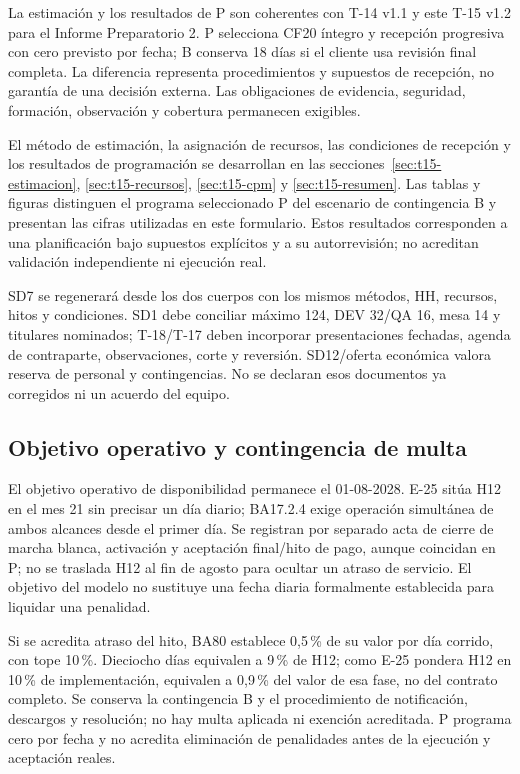 La estimación y los resultados de P son coherentes con T-14 v1.1 y este T-15 v1.2 para el Informe Preparatorio 2. P selecciona CF20 íntegro y recepción progresiva con cero previsto por fecha; B conserva 18 días si el cliente usa revisión final completa. La diferencia representa procedimientos y supuestos de recepción, no garantía de una decisión externa. Las obligaciones de evidencia, seguridad, formación, observación y cobertura permanecen exigibles.

El método de estimación, la asignación de recursos, las condiciones de recepción y los resultados de programación se desarrollan en las secciones~\ref{sec:t15-estimacion}, \ref{sec:t15-recursos}, \ref{sec:t15-cpm} y \ref{sec:t15-resumen}. Las tablas y figuras distinguen el programa seleccionado P del escenario de contingencia B y presentan las cifras utilizadas en este formulario. Estos resultados corresponden a una planificación bajo supuestos explícitos y a su autorrevisión; no acreditan validación independiente ni ejecución real.

SD7 se regenerará desde los dos cuerpos con los mismos métodos, HH, recursos, hitos y condiciones. SD1 debe conciliar máximo 124, DEV 32/QA 16, mesa 14 y titulares nominados; T-18/T-17 deben incorporar presentaciones fechadas, agenda de contraparte, observaciones, corte y reversión. SD12/oferta económica valora reserva de personal y contingencias. No se declaran esos documentos ya corregidos ni un acuerdo del equipo.

\subsection{Objetivo operativo y contingencia de multa}
El objetivo operativo de disponibilidad permanece el 01-08-2028. E-25 sitúa H12 en el mes 21 sin precisar un día diario; BA17.2.4 exige operación simultánea de ambos alcances desde el primer día. Se registran por separado acta de cierre de marcha blanca, activación y aceptación final/hito de pago, aunque coincidan en P; no se traslada H12 al fin de agosto para ocultar un atraso de servicio. El objetivo del modelo no sustituye una fecha diaria formalmente establecida para liquidar una penalidad.

Si se acredita atraso del hito, BA80 establece 0,5\,\% de su valor por día corrido, con tope 10\,\%. Dieciocho días equivalen a 9\,\% de H12; como E-25 pondera H12 en 10\,\% de implementación, equivalen a 0,9\,\% del valor de esa fase, no del contrato completo. Se conserva la contingencia B y el procedimiento de notificación, descargos y resolución; no hay multa aplicada ni exención acreditada. P programa cero por fecha y no acredita eliminación de penalidades antes de la ejecución y aceptación reales.
